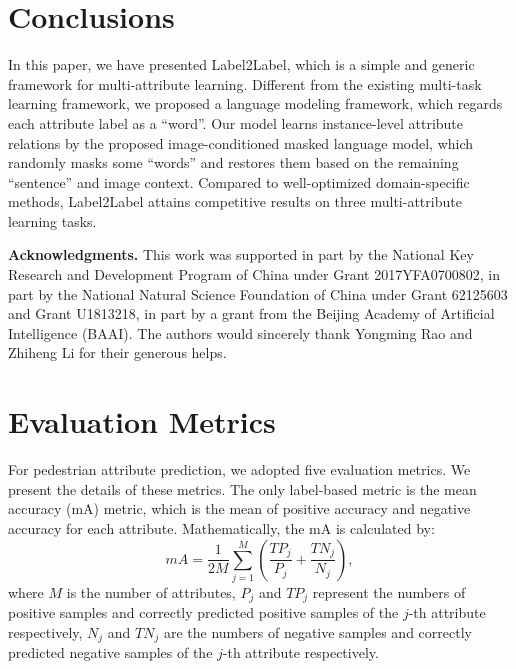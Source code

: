 \documentclass[runningheads]{llncs}
\begin{document}
\section{Conclusions}
In this paper, we have presented Label2Label, which is a simple and generic framework for multi-attribute learning. Different from the existing multi-task learning framework, we proposed a language modeling framework, which regards each attribute label as a ``word''. 
Our model learns instance-level attribute relations by the proposed image-conditioned masked language model, which randomly masks some ``words'' and restores them based on the remaining ``sentence'' and image context. Compared to well-optimized domain-specific methods, Label2Label attains competitive results on three multi-attribute learning tasks.

\noindent \textbf{Acknowledgments.} 
This work was supported in part by the National Key Research and Development Program of China under Grant 2017YFA0700802, in part by the National Natural Science Foundation of China under Grant 62125603 and Grant U1813218, in part by a grant from the Beijing Academy of Artificial Intelligence (BAAI).  The authors would sincerely thank Yongming Rao and Zhiheng Li for their generous helps.





\newpage
\appendix
\begin{center}
\end{center}


\section{Evaluation Metrics}
For pedestrian attribute prediction, we adopted five evaluation metrics. We present the details of these metrics. The only label-based metric is the mean accuracy (mA) metric, which is the mean of positive accuracy and negative accuracy for each attribute. Mathematically, the mA is calculated by:
\begin{equation}
mA = \frac{1}{2M} \sum_{j=1}^{M} (\frac{TP_j}{P_j} + \frac{TN_j}{N_j}),
\label{equ:metric:mA}
\end{equation}
where $M$ is the number of attributes, $P_j$ and $TP_j$ represent the numbers of positive samples and correctly predicted positive samples of the $j$-th attribute respectively, $N_j$ and $TN_j$ are the numbers of negative samples and correctly predicted negative samples of the $j$-th attribute respectively.
\end{document}
